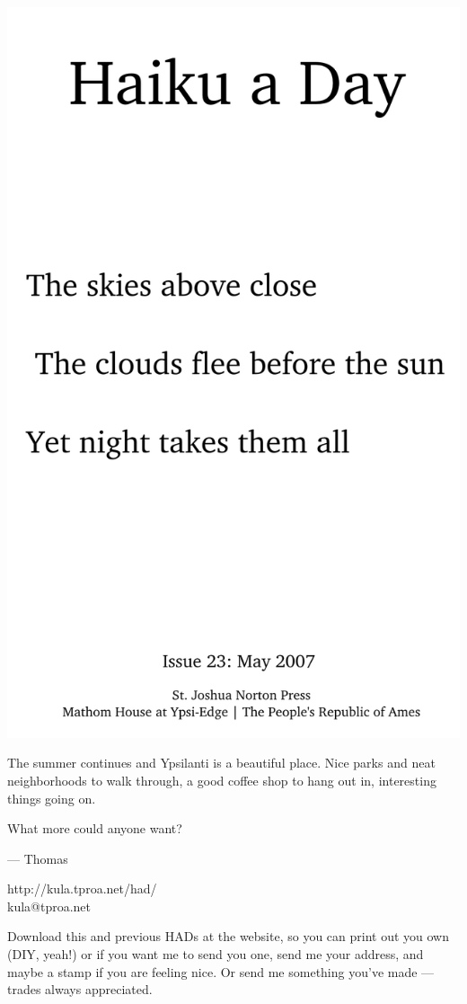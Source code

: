 \documentclass[12pt]{article}
\begin{document}
\includegraphics{frontpage.png}

\newpage

The summer continues and Ypsilanti is a beautiful place. 
Nice parks and neat neighborhoods to walk through, a good
coffee shop to hang out in, interesting things going on.

What more could anyone want?

--- Thomas

http://kula.tproa.net/had/ \\
kula@tproa.net

Download this and previous HADs at the website, so you can
print out you own (DIY, yeah!) or if you want me to send
you one, send me your address, and maybe a stamp if you
are feeling nice. Or send me something you've made ---
trades always appreciated.
\end{document}
